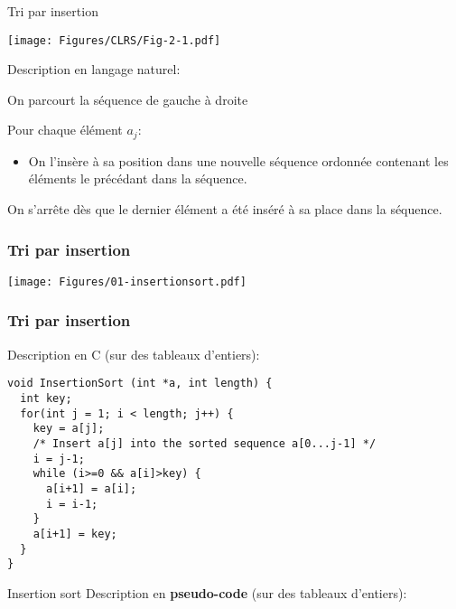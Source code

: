\begin{frame}{Tri par insertion}

\hfill\texttt{[image: Figures/CLRS/Fig-2-1.pdf]}

Description en langage naturel:

\bigskip

On parcourt la séquence de gauche à droite

\bigskip

Pour chaque élément $a_j$:
\begin{itemize}
\item On l'{\alert{insère}} à sa position dans une nouvelle séquence ordonnée contenant les éléments le précédant dans la séquence.
\end{itemize}
On s'arrête dès que le dernier élément a été inséré à sa place dans la séquence.

\end{frame}

\begin{frame}
\frametitle{Tri par insertion}
\centerline{\texttt{[image: Figures/01-insertionsort.pdf]}}
\end{frame}

\begin{frame}[fragile]
\frametitle{Tri par insertion}

Description en C (sur des tableaux d'entiers):

{\small
\begin{verbatim}
void InsertionSort (int *a, int length) {
  int key;
  for(int j = 1; i < length; j++) {
    key = a[j];
    /* Insert a[j] into the sorted sequence a[0...j-1] */
    i = j-1;
    while (i>=0 && a[i]>key) {
      a[i+1] = a[i];
      i = i-1;
    }
    a[i+1] = key;
  }
}
\end{verbatim}
}

\end{frame}

\begin{frame}{Insertion sort}
Description en {\bf pseudo-code} (sur des tableaux d'entiers):

\bigskip


\end{frame}


